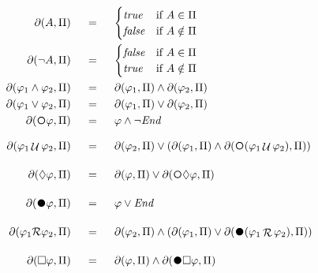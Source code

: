 \begin{align}
\begin{aligned}
\Dfun{A} 			\ind &= \ind 
\begin{cases}
\true 	& \text{if}\ A \in \PropInt\\
\false  & \text{if}\ A \notin \PropInt\\
\end{cases}\\
\Dfun{\lnot A} 			\ind &= \ind 
\begin{cases}
\false 	& \text{if}\ A \in \PropInt\\
\true   & \text{if}\ A \notin \PropInt\\
\end{cases}\\
\Dfun{\varphi_1 \lAND \varphi_2} 			\ind &= \ind   \Dfun{\varphi_1} \lAND \Dfun{\varphi_2}\\
\Dfun{\varphi_1 \lOR  \varphi_2} 			\ind &= \ind   \Dfun{\varphi_1} \lOR \Dfun{\varphi_2}\\
\Dfun{\Next \varphi} 	\ind &= \ind   \varphi \lAND \lnot \Ended\\
\Dfun{\varphi_1 \lUntil \varphi_2} 	\ind &= \ind   \Dfun{\varphi_2} \lOR (\Dfun{\varphi_1} \lAND\Dfun{\Next(\varphi_1 \lUntil \varphi_2)})\\
\Dfun{\Diamond \varphi} 	\ind &= \ind   \Dfun{\varphi} \lOR \Dfun{\Next \Diamond \varphi}\\
\Dfun{\Wnext \varphi} 	\ind &= \ind   \varphi \lOR \Ended\\
\Dfun{\varphi_1 \R \varphi_2} 	\ind &= \ind   \Dfun{\varphi_2} \lAND (\Dfun{\varphi_1} \lOR \Dfun{\Wnext(\varphi_1 \Release \varphi_2)})\\
\Dfun{\Box \varphi} 	\ind &= \ind   \Dfun{\varphi} \lAND \Dfun{\Wnext \Box \varphi}\label{delta-ltlf}
\end{aligned}		
\end{align}
